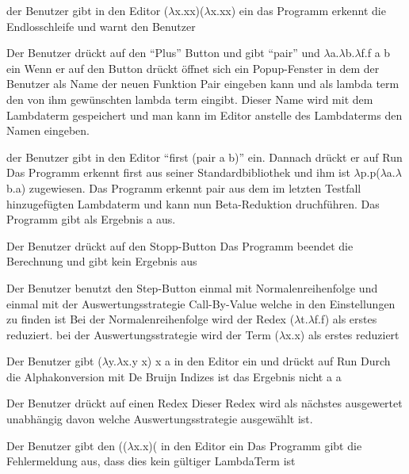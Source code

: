 \documentclass[parskip=full,11pt,twoside]{scrartcl}
\begin{document}
{der Benutzer gibt in den Editor ($\lambda$x.xx)($\lambda$x.xx) ein }
{ das Programm erkennt die Endlosschleife und warnt den Benutzer }

{ Der Benutzer drückt auf den \enquote {Plus} Button und gibt \enquote {pair} und $\lambda$a.$\lambda$b.$\lambda$f.f a b ein }
{Wenn er auf den Button drückt öffnet sich ein Popup-Fenster in dem der Benutzer als Name der neuen Funktion Pair eingeben kann und als lambda term den von ihm gewünschten lambda term eingibt. Dieser Name wird mit dem Lambdaterm gespeichert und man kann im Editor anstelle des Lambdaterms den Namen eingeben. }

{ der Benutzer gibt in den Editor \enquote {first (pair a b)} ein. Dannach drückt er auf Run}
{ Das Programm erkennt first aus seiner Standardbibliothek und ihm ist $\lambda$p.p($\lambda$a.$\lambda$b.a) zugewiesen. Das Programm erkennt pair aus dem im letzten Testfall hinzugefügten Lambdaterm und kann nun Beta-Reduktion druchführen. Das Programm gibt als Ergebnis a aus.}

{Der Benutzer drückt auf den Stopp-Button}
{ Das Programm beendet die Berechnung und gibt kein Ergebnis aus }

{Der Benutzer benutzt den Step-Button einmal mit Normalenreihenfolge  und einmal mit der Auswertungsstrategie Call-By-Value welche in den Einstellungen zu finden ist}
{ Bei der Normalenreihenfolge wird der Redex ($\lambda$t.$\lambda$f.f) als erstes reduziert. bei der Auswertungsstrategie wird der Term ($\lambda$x.x) als erstes reduziert }

{ Der Benutzer gibt ($\lambda$y.$\lambda$x.y x) x a in den Editor ein und drückt auf Run}
{ Durch die Alphakonversion mit De Bruijn Indizes ist das Ergebnis nicht a  a  }

 { Der Benutzer drückt auf einen Redex}
{ Dieser Redex wird als nächstes ausgewertet unabhängig davon welche Auswertungsstrategie ausgewählt ist. }

{ Der Benutzer gibt den (($\lambda$x.x)( in den Editor ein }
{ Das Programm gibt die Fehlermeldung aus, dass dies kein gültiger LambdaTerm ist }
\end{document}
